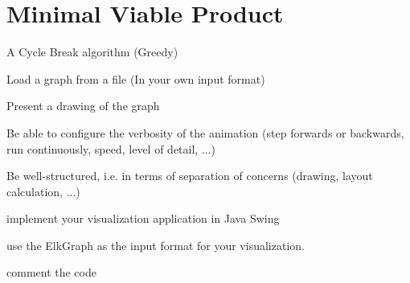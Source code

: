 \section{Minimal Viable Product}

\begin{list}{-}{}
\item A Cycle Break algorithm (Greedy)
\item Load a graph from a file (In your own input format)
\item Present a drawing of the graph
\item Be able to configure the verbosity of the animation (step forwards or backwards, run continuously, speed, level of detail, ...)
\item Be well-structured, i.e. in terms of separation of concerns (drawing, layout calculation, ...)
\item implement your visualization application in Java Swing

\item use the ElkGraph as the input format for your visualization.


\item comment the code
\end{list}